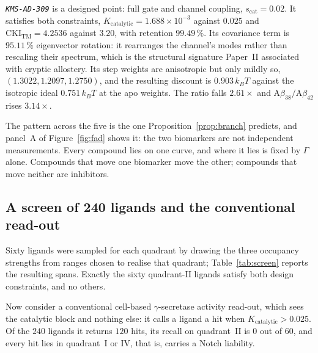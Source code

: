 \documentclass[11pt,reqno]{amsart}
\theoremstyle{plain}
\theoremstyle{definition}
\theoremstyle{remark}
\numberwithin{equation}{section}
\newcommand{\CKI}{\mathrm{CKI}}
\newcommand{\Kcat}{K_{\mathrm{catalytic}}}
\newcommand{\CKItm}{\CKI_{\mathrm{TM}}}
\newcommand{\Ab}{\mathrm{A}\beta}
\newcommand{\kT}{k_{B}T}
\newcommand{\lead}{\texttt{KMS-AD-309}}
\begin{document}
\emph{\lead{}} is a designed point: full gate and channel coupling, $s_{\mathrm{cat}}=0.02$. It satisfies both constraints, $\Kcat=1.688\times10^{-3}$ against $0.025$ and $\CKItm=4.2536$ against $3.20$, with retention $99.49\,\%$. Its covariance term is $95.11\,\%$ eigenvector rotation: it rearranges the channel's modes rather than rescaling their spectrum, which is the structural signature Paper~II associated with cryptic allostery. Its step weights are anisotropic but only mildly so, $(1.3022,1.2097,1.2750)$, and the resulting discount is $0.903\,\kT$ against the isotropic ideal $0.751\,\kT$ at the apo weights. The ratio falls $2.61\times$ and $\Ab_{38}/\Ab_{42}$ rises $3.14\times$.

The pattern across the five is the one Proposition~\ref{prop:branch} predicts, and panel~A of Figure~\ref{fig:fad} shows it: the two biomarkers are not independent measurements. Every compound lies on one curve, and where it lies is fixed by $\Gamma$ alone. Compounds that move one biomarker move the other; compounds that move neither are inhibitors.

\subsection{A screen of 240 ligands and the conventional read-out}
Sixty ligands were sampled for each quadrant by drawing the three occupancy strengths from ranges chosen to realise that quadrant; Table~\ref{tab:screen} reports the resulting spans. Exactly the sixty quadrant-II ligands satisfy both design constraints, and no others.

Now consider a conventional cell-based $\gamma$-secretase activity read-out, which sees the catalytic block and nothing else: it calls a ligand a hit when $\Kcat>0.025$. Of the $240$ ligands it returns $120$ hits, its recall on quadrant~II is $0$ out of $60$, and every hit lies in quadrant~I or IV, that is, carries a Notch liability.
\end{document}
